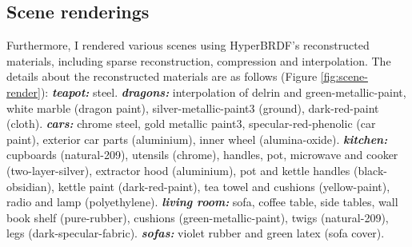 \subsection{Scene renderings}
Furthermore, I rendered various scenes \cite{resources16} using HyperBRDF's reconstructed materials, including sparse reconstruction, compression and interpolation. The details about the reconstructed materials are as follows (Figure \ref{fig:scene-render}): \textbf{\textit{teapot:}} steel. \textbf{\textit{dragons:}} interpolation of delrin and green-metallic-paint, white marble (dragon paint), silver-metallic-paint3 (ground), dark-red-paint (cloth). \textbf{\textit{cars:}} chrome steel, gold metallic paint3, specular-red-phenolic (car paint), exterior car parts (aluminium), inner wheel (alumina-oxide). \textbf{\textit{kitchen:}} cupboards (natural-209), utensils (chrome), handles, pot, microwave and cooker (two-layer-silver), extractor hood (aluminium), pot and kettle handles (black-obsidian), kettle paint (dark-red-paint), tea towel and cushions (yellow-paint), radio and lamp (polyethylene). \textbf{\textit{living room:}} sofa, coffee table, side tables, wall book shelf (pure-rubber), cushions (green-metallic-paint), twigs (natural-209), legs (dark-specular-fabric).
\textbf{\textit{sofas:}} violet rubber and green latex (sofa cover). 

